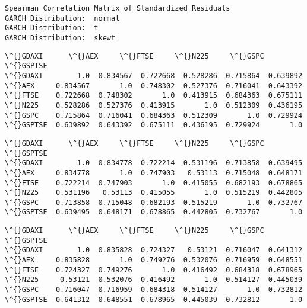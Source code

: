 \documentclass[11pt]{article}
\begin{document}
    \begin{Verbatim}[commandchars=\\\{\}]
Spearman Correlation Matrix of Standardized Residuals
GARCH Distribution:  normal
GARCH Distribution:  t
GARCH Distribution:  skewt
    \end{Verbatim}

    
    \begin{Verbatim}[commandchars=\\\{\}]
           \^{}GDAXI      \^{}AEX     \^{}FTSE     \^{}N225     \^{}GSPC   \^{}GSPTSE
\^{}GDAXI        1.0  0.834567  0.722668  0.528286  0.715864  0.639892
\^{}AEX     0.834567       1.0  0.748302  0.527376  0.716041  0.643392
\^{}FTSE    0.722668  0.748302       1.0  0.413915  0.684363  0.675111
\^{}N225    0.528286  0.527376  0.413915       1.0  0.512309  0.436195
\^{}GSPC    0.715864  0.716041  0.684363  0.512309       1.0  0.729924
\^{}GSPTSE  0.639892  0.643392  0.675111  0.436195  0.729924       1.0
    \end{Verbatim}

    
    
    \begin{Verbatim}[commandchars=\\\{\}]
           \^{}GDAXI      \^{}AEX     \^{}FTSE     \^{}N225     \^{}GSPC   \^{}GSPTSE
\^{}GDAXI        1.0  0.834778  0.722214  0.531196  0.713858  0.639495
\^{}AEX     0.834778       1.0  0.747903   0.53113  0.715048  0.648171
\^{}FTSE    0.722214  0.747903       1.0  0.415055  0.682193  0.678865
\^{}N225    0.531196   0.53113  0.415055       1.0  0.515219  0.442805
\^{}GSPC    0.713858  0.715048  0.682193  0.515219       1.0  0.732767
\^{}GSPTSE  0.639495  0.648171  0.678865  0.442805  0.732767       1.0
    \end{Verbatim}

    
    
    \begin{Verbatim}[commandchars=\\\{\}]
           \^{}GDAXI      \^{}AEX     \^{}FTSE     \^{}N225     \^{}GSPC   \^{}GSPTSE
\^{}GDAXI        1.0  0.835828  0.724327   0.53121  0.716047  0.641312
\^{}AEX     0.835828       1.0  0.749276  0.532076  0.716959  0.648551
\^{}FTSE    0.724327  0.749276       1.0  0.416492  0.684318  0.678965
\^{}N225     0.53121  0.532076  0.416492       1.0  0.514127  0.445039
\^{}GSPC    0.716047  0.716959  0.684318  0.514127       1.0  0.732812
\^{}GSPTSE  0.641312  0.648551  0.678965  0.445039  0.732812       1.0
    \end{Verbatim}
\end{document}
